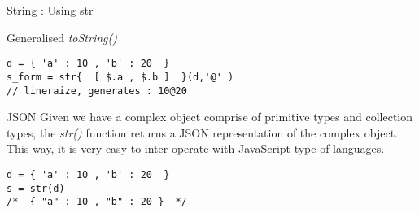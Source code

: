 \begin{section}{String : Using str}
\begin{subsection}{Generalised \emph{toString()} }
\begin{lstlisting}[style=JexlStyle]
d = { 'a' : 10 , 'b' : 20  } 
s_form = str{  [ $.a , $.b ]  }(d,'@' ) 
// lineraize, generates : 10@20
\end{lstlisting}
\end{subsection}

\begin{subsection}{JSON}
Given we have a complex object comprise of primitive types and collection types, 
the \emph{str()} function returns a JSON representation of the complex object.
This way, it is very easy to inter-operate with JavaScript type of languages.

\begin{center}\begin{minipage}{\linewidth}
\begin{lstlisting}[style=JexlStyle]
d = { 'a' : 10 , 'b' : 20  } 
s = str(d)
/*  { "a" : 10 , "b" : 20 }  */
\end{lstlisting}
\end{minipage}\end{center}

\end{subsection}

\end{section}

